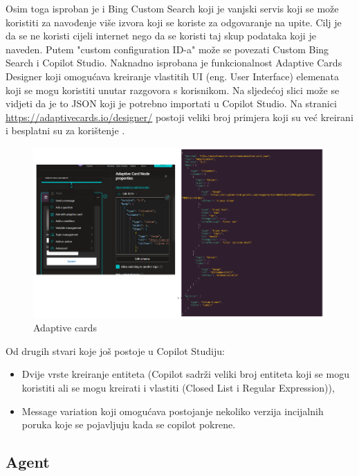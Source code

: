 \documentclass[]{foi}
\begin{document}
Osim toga isproban je i Bing Custom Search koji je vanjski servis koji se može koristiti za navođenje više izvora koji se koriste za odgovaranje na upite. Cilj je da se ne koristi cijeli
internet nego da se koristi taj skup podataka koji je naveden. Putem "custom configuration ID-a" može se povezati Custom Bing Search i Copilot Studio.
Naknadno isprobana je funkcionalnost Adaptive Cards Designer koji omogućava kreiranje vlastitih UI (eng. User Interface) elemenata koji se mogu koristiti unutar razgovora s korisnikom. 
Na sljedećoj slici može se vidjeti da je to JSON koji je potrebno importati u Copilot Studio. Na stranici \underline{https://adaptivecards.io/designer/} postoji veliki broj 
primjera koji su već kreirani i besplatni su za korištenje \cite{copilot2025}.

\begin{figure}[ht!]
    \centering
    \includegraphics[width=1\textwidth]{./assets/Adaptive_cards.png} 
    \caption{Adaptive cards}
    \label{fig:slika3}
\end{figure}

Od drugih stvari koje još postoje u Copilot Studiju:
\begin{itemize}
\item Dvije vrste kreiranje entiteta (Copilot sadrži veliki broj entiteta koji se mogu koristiti ali se mogu kreirati i vlastiti (Closed List i Regular Expression)),
\item Message variation koji omogućava postojanje nekoliko verzija incijalnih poruka koje se pojavljuju kada se copilot pokrene. 
\end{itemize}

\subsection{Agent}
\end{document}
